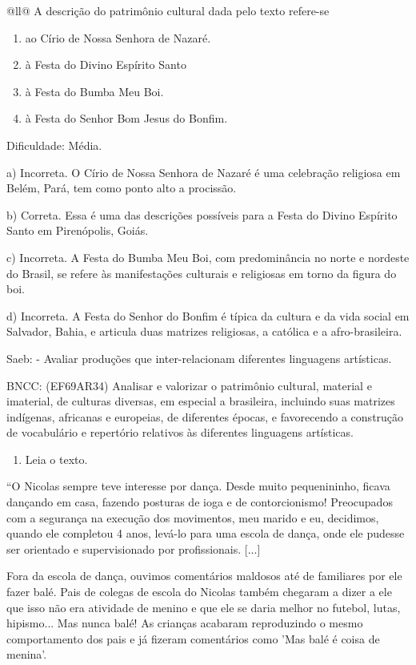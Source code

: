 \begin{itemize}
\begin{itemize}
\begin{escolha}[]{@{}ll@{}}
A descrição do patrimônio cultural dada pelo texto refere-se

\begin{enumerate}
\def\labelenumi{\alph{enumi})}
\item
  ao Círio de Nossa Senhora de Nazaré.
\item
  à Festa do Divino Espírito Santo
\item
  à Festa do Bumba Meu Boi.
\item
  à Festa do Senhor Bom Jesus do Bonfim.
\end{enumerate}

Dificuldade: Média.

a) Incorreta. O Círio de Nossa Senhora de Nazaré é uma celebração
religiosa em Belém, Pará, tem como ponto alto a procissão.

b) Correta. Essa é uma das descrições possíveis para a Festa do Divino
Espírito Santo em Pirenópolis, Goiás.

c) Incorreta. A Festa do Bumba Meu Boi, com predominância no norte e
nordeste do Brasil, se refere às manifestações culturais e religiosas em
torno da figura do boi.

d) Incorreta. A Festa do Senhor do Bonfim é típica da cultura e da vida
social em Salvador, Bahia, e articula duas matrizes religiosas, a
católica e a afro-brasileira.

Saeb: - Avaliar produções que inter-relacionam diferentes linguagens
artísticas.

BNCC: (EF69AR34) Analisar e valorizar o patrimônio cultural, material e
imaterial, de culturas diversas, em especial a brasileira, incluindo
suas matrizes indígenas, africanas e europeias, de diferentes épocas, e
favorecendo a construção de vocabulário e repertório relativos às
diferentes linguagens artísticas.

\begin{enumerate}
\def\labelenumi{\arabic{enumi}.}
\item
  Leia o texto.
\end{enumerate}

``O Nicolas sempre teve interesse por dança. Desde muito pequenininho,
ficava dançando em casa, fazendo posturas de ioga e de contorcionismo!
Preocupados com a segurança na execução dos movimentos, meu marido e eu,
decidimos, quando ele completou 4 anos, levá-lo para uma escola de
dança, onde ele pudesse ser orientado e supervisionado por
profissionais. {[}...{]}

Fora da escola de dança, ouvimos comentários maldosos até de familiares
por ele fazer balé. Pais de colegas de escola do Nicolas também chegaram
a dizer a ele que isso não era atividade de menino e que ele se daria
melhor no futebol, lutas, hipismo... Mas nunca balé! As crianças
acabaram reproduzindo o mesmo comportamento dos pais e já fizeram
comentários como 'Mas balé é coisa de menina'.


\end{escolha}
\end{itemize}
\end{itemize}
